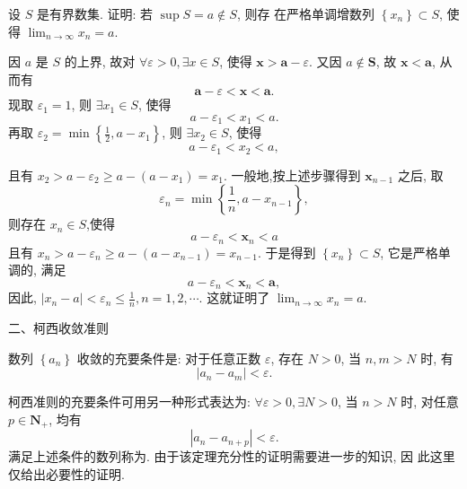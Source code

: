 \documentclass[t,12pt,mathserif] {beamer}
\begin{document}
\begin{frame}{}%
\addtocounter{ex}{1}
\begin{ex}
   设 $S$ 是有界数集. 证明: 若 $\sup S=a \notin S$, 则存 在严格单调增数列 $\left\{x_n\right\} \subset S$, 使得 $\lim _{n \rightarrow \infty} x_n=a$. 
\end{ex}
\zheng 因 $a$ 是 $S$ 的上界, 故对 $\forall \varepsilon>0, \exists x \in S$, 使得 $\boldsymbol{x}>\boldsymbol{a}-\varepsilon$. 又因 $a \notin \boldsymbol{S}$, 故 $\boldsymbol{x}<\boldsymbol{a}$, 从而有
$$
\boldsymbol{a}-\varepsilon<\boldsymbol{x}<\boldsymbol{a} .
$$
现取 $\varepsilon_1=1$, 则 $\exists x_1 \in S$, 使得
$$
a-\varepsilon_1<x_1<a .
$$
再取 $\varepsilon_2=\min \left\{\frac{1}{2}, a-x_1\right\}$, 则 $\exists x_2 \in S$, 使得  
$$
a-\varepsilon_1<x_2<a,
$$

\end{frame}
\begin{frame}{}%
  且有 $x_2>a-\varepsilon_2 \geq a-\left(a-x_1\right)=x_1$.
一般地,按上述步骤得到 $\boldsymbol{x}_{n-1}$ 之后, 取
$$
\varepsilon_n=\min \left\{\frac{1}{n}, a-x_{n-1}\right\},
$$
则存在 $x_n \in S$,使得
$$
a-\varepsilon_n<\boldsymbol{x}_n<a
$$
且有 $x_n>a-\varepsilon_n \geq a-\left(a-x_{n-1}\right)=x_{n-1}$.
于是得到 $\left\{x_n\right\} \subset S$, 它是严格单调的, 满足  
$$
a-\varepsilon_n<\boldsymbol{x}_n<\boldsymbol{a},
$$
因此, $\left|x_n-a\right|<\varepsilon_n \leq \frac{1}{n}, n=1,2, \cdots$.
这就证明了 $\lim _{n \rightarrow \infty} x_n=a$.
\end{frame}

\begin{frame}{二、柯西收敛准则}%
\begin{thm}
 数列 $\left\{a_n\right\}$ 收敛的充要条件是:
对于任意正数 $\varepsilon$, 存在 $N>0$, 当 $n, m>N$ 时, 有
$$
\left|a_n-a_m\right|<\varepsilon . 
$$
\end{thm}
柯西准则的充要条件可用另一种形式表达为:
$\forall \varepsilon>0, \exists N>0$, 当 $n>N$ 时, 对任意 $p \in \mathbf{N}_{+}$, 均有
$$
\left|a_n-a_{n+p}\right|<\varepsilon .
$$
满足上述条件的数列称为.   
由于该定理充分性的证明需要进一步的知识, 因 此这里仅给出必要性的证明.

\end{frame}
\end{document}
